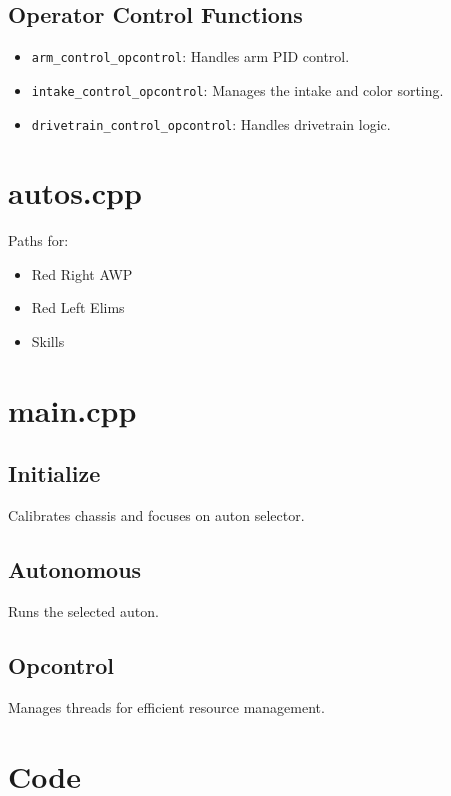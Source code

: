 \subsection*{Operator Control Functions}
\begin{itemize}[noitemsep]
    \item \texttt{arm\_control\_opcontrol}: Handles arm PID control.
    \item \texttt{intake\_control\_opcontrol}: Manages the intake and color sorting.
    \item \texttt{drivetrain\_control\_opcontrol}: Handles drivetrain logic.
\end{itemize}

\section*{autos.cpp}
Paths for:
\begin{itemize}[noitemsep]
    \item Red Right AWP
    \item Red Left Elims
    \item Skills
\end{itemize}

\section*{main.cpp}
\subsection*{Initialize}
Calibrates chassis and focuses on auton selector.

\subsection*{Autonomous}
Runs the selected auton.

\subsection*{Opcontrol}
Manages threads for efficient resource management.
\pagebreak
\section*{Code}
